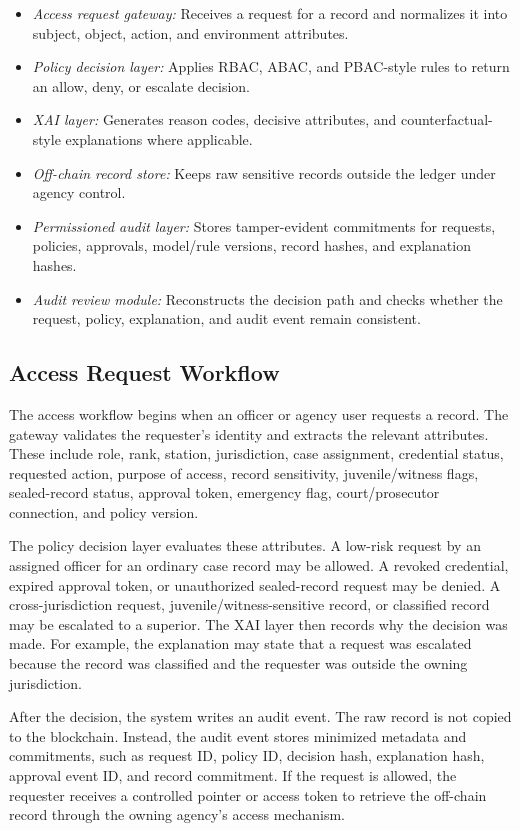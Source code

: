 \begin{itemize}
    \item \textit{Access request gateway:} Receives a request for a record and normalizes it into subject, object, action, and environment attributes.
    \item \textit{Policy decision layer:} Applies RBAC, ABAC, and PBAC-style rules to return an allow, deny, or escalate decision.
    \item \textit{XAI layer:} Generates reason codes, decisive attributes, and counterfactual-style explanations where applicable.
    \item \textit{Off-chain record store:} Keeps raw sensitive records outside the ledger under agency control.
    \item \textit{Permissioned audit layer:} Stores tamper-evident commitments for requests, policies, approvals, model/rule versions, record hashes, and explanation hashes.
    \item \textit{Audit review module:} Reconstructs the decision path and checks whether the request, policy, explanation, and audit event remain consistent.
\end{itemize}

\subsection{Access Request Workflow}

The access workflow begins when an officer or agency user requests a record. The gateway validates the requester's identity and extracts the relevant attributes. These include role, rank, station, jurisdiction, case assignment, credential status, requested action, purpose of access, record sensitivity, juvenile/witness flags, sealed-record status, approval token, emergency flag, court/prosecutor connection, and policy version.

The policy decision layer evaluates these attributes. A low-risk request by an assigned officer for an ordinary case record may be allowed. A revoked credential, expired approval token, or unauthorized sealed-record request may be denied. A cross-jurisdiction request, juvenile/witness-sensitive record, or classified record may be escalated to a superior. The XAI layer then records why the decision was made. For example, the explanation may state that a request was escalated because the record was classified and the requester was outside the owning jurisdiction.

After the decision, the system writes an audit event. The raw record is not copied to the blockchain. Instead, the audit event stores minimized metadata and commitments, such as request ID, policy ID, decision hash, explanation hash, approval event ID, and record commitment. If the request is allowed, the requester receives a controlled pointer or access token to retrieve the off-chain record through the owning agency's access mechanism.

